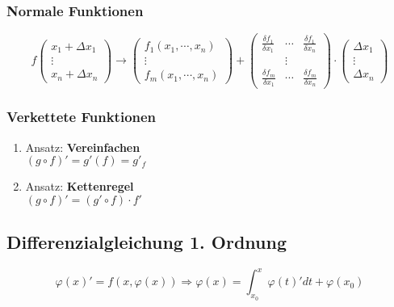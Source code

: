 \subsubsection{Normale Funktionen}
\begin{displaymath}
	f
	\begin{pmatrix}
		x_1 + \Delta x_1 \\
		\vdots \\
		x_n + \Delta x_n
	\end{pmatrix}
	\rightarrow
	\begin{pmatrix}
		f_1(x_1,\cdots , x_n) \\
		\vdots \\
		f_m(x_1,\cdots , x_n)
	\end{pmatrix}
	+
	\begin{pmatrix}
		\frac{\delta f_1}{\delta x_1} & \cdots & \frac{\delta f_1}{\delta x_n} \\
		& \vdots & \\
		\frac{\delta f_m}{\delta x_1} & \cdots & \frac{\delta f_m}{\delta x_n}
	\end{pmatrix}
	\cdot
	\begin{pmatrix}
		\Delta x_1 \\
		\vdots \\
		\Delta x_n
	\end{pmatrix}
\end{displaymath}

\subsubsection{Verkettete Funktionen}
\begin{enumerate}
    \item Ansatz: \textbf{Vereinfachen} \\
    $(g \circ f)' = g'(f) = g'_f$

    \item Ansatz: \textbf{Kettenregel} \\
    $(g \circ f)' = (g' \circ f) \cdot f'$
\end{enumerate}

\subsection{Differenzialgleichung 1. Ordnung}
\begin{equation*}
    \varphi(x)' = f(x, \varphi(x)) \Rightarrow \varphi(x) = \int_{x_0}^x \varphi(t)' dt + \varphi(x_0)
\end{equation*}

